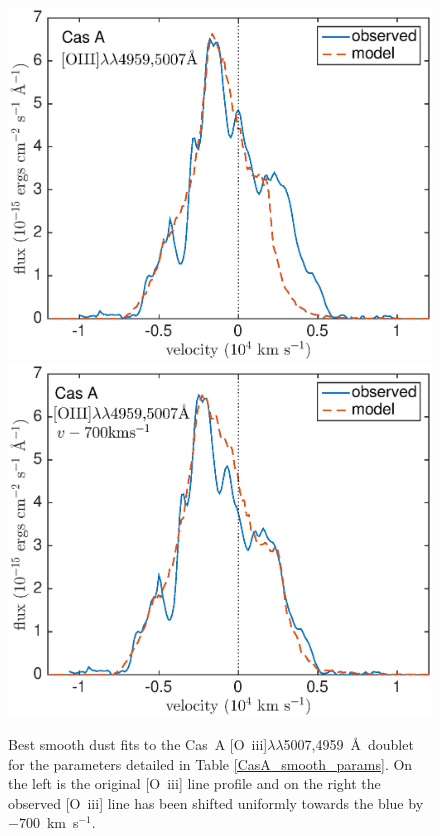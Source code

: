 \begin{figure}
\centering
\includegraphics[scale=0.43,clip=true, trim=30 0 50 20]{chapters/chapter6/figs/CasA/CasA_OIII}
\includegraphics[scale=0.43,clip=true, trim=30 0 50 20]{chapters/chapter6/figs/CasA/CasA_shifted_OIII}
\caption{Best smooth dust fits to the Cas~A [O~{\sc iii}]$\lambda\lambda$5007,4959~\AA\ doublet for the parameters detailed in Table \ref{CasA_smooth_params}.  On the left is the original [O~{\sc iii}] line profile and on the right the observed [O~{\sc iii}] line has been shifted uniformly towards the blue by $-700$~km~s$^{-1}$.}
\label{CasA_OIII}
\end{figure}

